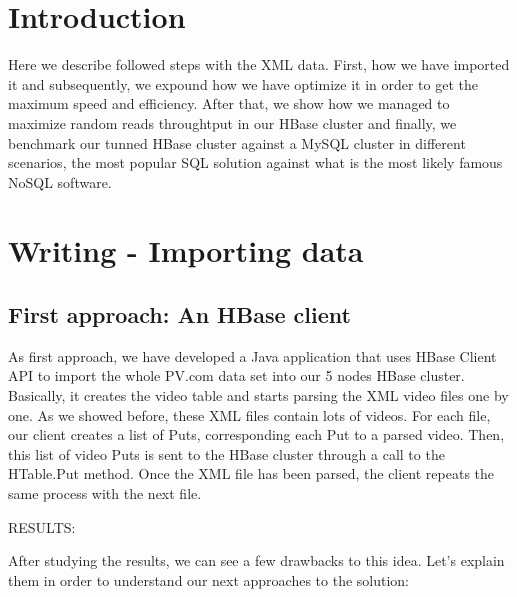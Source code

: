 \section{Introduction}

Here we describe followed steps with the XML data. First, how we have imported it and subsequently, we expound how we have optimize it in order to get the maximum speed and efficiency. After that, we show how we managed to maximize random reads throughtput in our HBase cluster and finally, we benchmark our tunned HBase cluster against a MySQL cluster in different scenarios, the most popular SQL solution against what is the most likely famous NoSQL software.

\section{Writing - Importing data}

\subsection{First approach: An HBase client}

As first approach, we have developed a Java application that uses HBase Client API to import the whole PV.com data set into our 5 nodes HBase cluster. Basically, it creates the video table and starts parsing the XML video files one by one. As we showed before, these XML files contain lots of videos. For each file, our client creates a list of Puts, corresponding each Put to a parsed video. Then, this list of video Puts is sent to the HBase cluster through a call to the HTable.Put method. Once the XML file has been parsed, the client repeats the same process with the next file.
\par
RESULTS:
\par
After studying the results, we can see a few drawbacks to this idea. Let's explain them in order to understand our next approaches to the solution:

